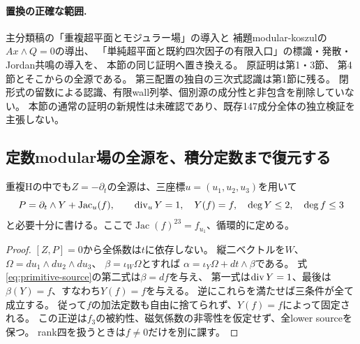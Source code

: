 \paragraph{置換の正確な範囲.}
主分類稿の「重複超平面とモジュラー場」の導入と
補題modular-koszulの$Ax\wedge Q=0$の導出、
「単純超平面と既約四次因子の有限入口」の標識・発散・Jordan共鳴の導入を、
本節の同じ証明へ置き換える。
原証明は第1・3節、
第4節とそこからの全源である。
第三配置の独自の三次式認識は第1節に残る。
閉形式の留数による認識、有限wall列挙、個別源の成分性と非包含を削除していない。
本節の通常の証明の新規性は未確認であり、既存147成分全体の独立検証を主張しない。

\subsection{定数modular場の全源を、積分定数まで復元する}
重複Hの中でも$Z=-\partial_t$の全源は、三座標$u=(u_1,u_2,u_3)$を用いて
\begin{equation}
 P=\partial_t\wedge Y+\operatorname{Jac}_u(f),\qquad
 \operatorname{div}_uY=1,\quad Y(f)=f,\quad \deg Y\le2,\quad\deg f\le3
                                                        \label{eq:constant-whole}
\end{equation}
と必要十分に書ける。ここで$\operatorname{Jac}(f)^{23}=f_{u_1}$、循環的に定める。
\begin{proof}
$[Z,P]=0$から全係数は$t$に依存しない。
縦二ベクトルを$W$、$\Omega=du_1\wedge du_2\wedge du_3$、
$\beta=\iota_W\Omega$とすれば
$\alpha=\iota_Y\Omega+dt\wedge\beta$である。
式\eqref{eq:primitive-source}の第二式は$\beta=df$を与え、
第一式は$\operatorname{div} Y=1$、最後は$\beta(Y)=f$、すなわち$Y(f)=f$を与える。
逆にこれらを満たせば三条件が全て成立する。
従って$f$の加法定数も自由に捨てられず、$Y(f)=f$によって固定される。
この正逆は$f_3$の被約性、磁気係数の非零性を仮定せず、全lower sourceを保つ。
rank四を扱うときは$f\ne0$だけを別に課す。
\end{proof}
